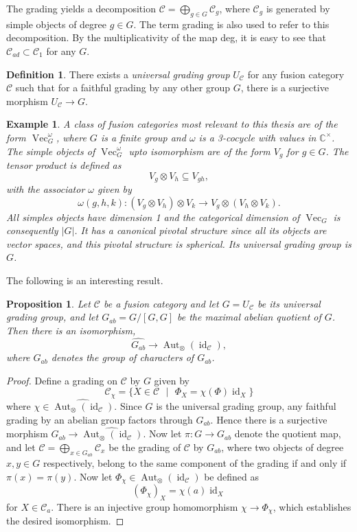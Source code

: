 \documentclass[11pt]{book}
\newtheorem{Prop}[theorem]{Proposition}
\theoremstyle{Rem}
\newtheorem{Expl}[theorem]{Example}
\theoremstyle{definition}
\newtheorem{Def}[theorem]{Definition}
\numberwithin{equation}{section}
\newcommand\id{\operatorname{id}}
\newcommand\ot{\otimes}
\newcommand\Vect{\operatorname{Vec}}
\newcommand\Aut{\operatorname{Aut}}
\newcommand\CC{\mathbb C}
\newcommand\C{\mathcal C}
\newcommand{\ra}\rightarrow
\begin{document}
The grading yields a decomposition $\C = \bigoplus_{g\in G}\C_g$, where $\C_g$ is generated by simple objects of degree $g\in G$. The term grading is also used to refer to this decomposition. By the multiplicativity of the map deg, it is easy to see that $\C_{ad}\subset \C_1$ for any $G$.
\begin{Def}
There exists a \textit{universal grading group} $U_\C$ for any fusion category $\C$ such that for a faithful grading by any other group $G$, there is a surjective morphism $U_{\C}\rightarrow G$.
\end{Def}
\begin{Expl}\rm\label{VecOmegaG}
A class of fusion categories most relevant to this thesis are of the form $\Vect^\omega_G$, where $G$ is a finite group and $\omega$ is a 3-cocycle with values in $\CC^\times$. The simple objects of $\Vect^\omega_G$ upto isomorphism are of the form $V_g$ for $g\in G$. The tensor product is defined as \begin{equation}
	V_g\ot V_h \subseteq V_{gh},
\end{equation} with the associator $\omega$ given by \begin{equation}
	\omega(g, h, k): (V_g \ot V_h)\ot V_k \ra V_g \ot (V_h\ot V_k).
\end{equation}
All simples objects have dimension 1 and the categorical dimension of $\Vect_G$ is consequently $|G|$. It has a canonical pivotal structure since all its objects are vector spaces, and this pivotal structure is spherical. Its universal grading group is $G$. 
\end{Expl}
\iffalse
The following is an interesting result.
\begin{Prop}
Let $\C$ be a fusion category and let $G = U_{\C}$ be its universal grading group, and let $G_{ab} = G/[G, G]$ be the maximal abelian quotient of $G$. Then there is an isomorphism, \begin{equation}
	\widehat{G_{ab}} \xrightarrow{~} \Aut_{\otimes}(\id_\C),
\end{equation}
where $G_{ab}$ denotes the group of characters of $G_{ab}$.
\end{Prop}
\begin{proof}
Define a grading on $\C$ by $G$ given by \begin{equation}
	\C_\chi = \{X\in \C \text{ }|\text{ } \Phi_X = \chi(\Phi)\id_X\}
\end{equation}
where $\chi \in  \widehat{\Aut_{\otimes}(\id_\C)}$. Since $G$ is the universal grading group, any faithful grading by an abelian group factors through $G_{ab}$. Hence there is a surjective morphism $G_{ab}\rightarrow \widehat{\Aut_{\otimes}(\id_\C)}$. 
Now let  $\pi:G\rightarrow G_{ab}$ denote the quotient map, and let $\C = \bigoplus_{x\in G_{ab}}\C_x$ be the grading of $\C$ by $G_{ab}$, where two objects of degree $x,y \in G$ respectively, belong to the same component of the grading if and only if $\pi(x) = \pi(y)$. Now let $\Phi_\chi\in \Aut_{\otimes}(\id_\C)$ be defined as \begin{equation}
	(\Phi_\chi)_X = \chi(a)\id_X
\end{equation} for $X \in \C_a$. There is an injective group homomorphism $\chi\rightarrow \Phi_\chi$, which establishes the desired isomorphism.                    
\end{proof}
\end{document}

